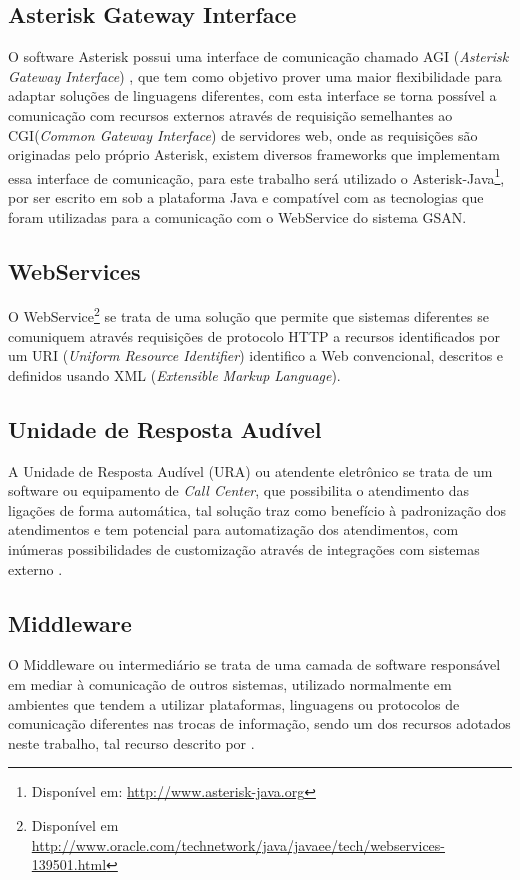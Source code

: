 \subsection{Asterisk Gateway Interface}
O software Asterisk possui uma interface de comunicação chamado AGI (\textit{Asterisk Gateway Interface}) \cite{asteriskAgi}, que tem como objetivo prover uma maior flexibilidade para adaptar soluções de linguagens diferentes, com esta interface se torna possível a comunicação com recursos externos através de requisição semelhantes ao CGI(\textit{Common Gateway Interface}) de servidores web, onde as requisições são originadas pelo próprio Asterisk, existem diversos frameworks que implementam essa interface de comunicação, para este trabalho  será utilizado o Asterisk-Java\footnote{Disponível em: \url{http://www.asterisk-java.org}}, por ser escrito em sob a plataforma Java e compatível com as tecnologias que foram utilizadas para a comunicação com o WebService do sistema GSAN.

\subsection{WebServices}
O WebService\footnote{Disponível em \url{http://www.oracle.com/technetwork/java/javaee/tech/webservices-139501.html}} se trata de uma solução que permite que sistemas diferentes se comuniquem através requisições de protocolo HTTP a recursos identificados por um URI (\textit{Uniform Resource Identifier}) identifico a Web convencional, descritos e definidos usando XML (\textit{Extensible Markup Language}).

\subsection{Unidade de Resposta Audível}
A Unidade de Resposta Audível (URA) ou atendente eletrônico se trata de um software ou equipamento de \textit{Call Center}, que possibilita o atendimento das ligações de forma automática, tal solução traz como benefício à padronização dos atendimentos e tem potencial para automatização dos atendimentos, com inúmeras possibilidades de customização através de integrações com sistemas externo \cite{VIEIRA:2007}.

\subsection{Middleware}
O Middleware ou intermediário se trata de uma camada de software responsável em mediar à comunicação de outros sistemas, utilizado normalmente em ambientes que tendem a utilizar plataformas, linguagens ou protocolos de comunicação diferentes nas trocas de informação, sendo um dos recursos adotados neste trabalho, tal recurso descrito por .

